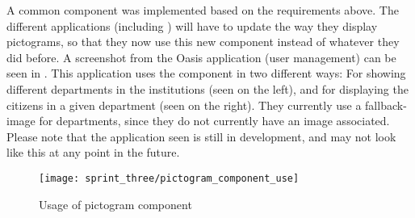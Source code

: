 A common component was implemented based on the requirements above. The different applications (including \ct) will have to update the way they display pictograms, so that they now use this new component instead of whatever they did before. A screenshot from the Oasis application (user management) can be seen in . This application uses the component in two different ways: For showing different departments in the institutions (seen on the left), and for displaying the citizens in a given department (seen on the right). They currently use a fallback-image for departments, since they do not currently have an image associated. Please note that the application seen is still in development, and may not look like this at any point in the future. 

\begin{figure}[!htbp]
	\centering
	\texttt{[image: sprint\_three/pictogram\_component\_use]}
	\caption{Usage of pictogram component}
	\label{fig:pictogram_component_use}
\end{figure}